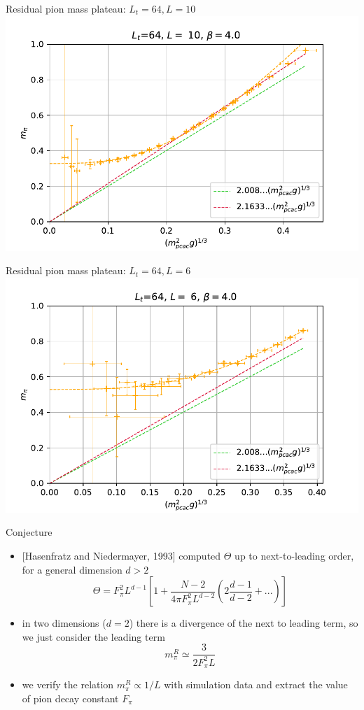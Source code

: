 \documentclass[english]{beamer}
\begin{document}
\begin{frame}{Residual pion mass plateau: $L_t = 64, L = 10$}
  \includegraphics[width=1\textwidth]{figs/Mpi10x64}
\end{frame}

\begin{frame}{Residual pion mass plateau: $L_t = 64, L = 6$}
  \includegraphics[width=1\textwidth]{figs/Mpi6x64Pt10}
\end{frame}

\begin{frame}{Conjecture}
  \begin{itemize}
    \item {[Hasenfratz and Niedermayer, 1993]} computed $\Theta$
      up to next-to-leading order, for a general dimension $d > 2$
            \[
        \Theta = F_\pi^2 L^{d-1} \left[1 +
          \frac{N - 2}{4\pi F_\pi^2 L^{d-2}}
          \left(2\frac{d - 1}{d - 2} + ...\right) \right]
      \]
    \item in two dimensions ($d = 2$) there is a divergence of 
      the next to leading term, so we just consider the 
      leading term
      \[
        m_\pi^R \simeq \frac{3}{2F_\pi^2 L}
      \]
    \item we verify the relation $m_\pi^R \propto 1 / L$ with
      simulation data and extract the value of pion decay
      constant $F_\pi$
  \end{itemize}
\end{frame}
\end{document}
